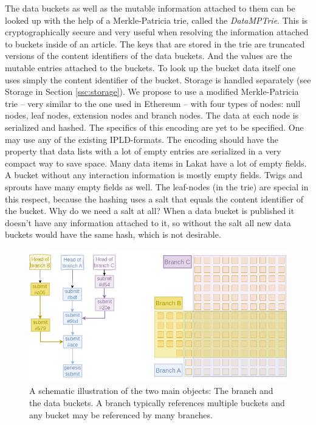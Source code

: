 The data buckets as well as the mutable information attached to them can be looked up with the help of a Merkle-Patricia trie, called the \textit{DataMPTrie}. This is cryptographically secure and very useful when resolving the information attached to buckets inside of an article. The keys that are stored in the trie are truncated versions of the content identifiers of the data buckets. And the values are the mutable entries attached to the buckets. To look up the bucket data itself one uses simply the content identifier of the bucket. Storage is handled separately (see Storage in Section \ref{ssc:storage}).
We propose to use a modified Merkle-Patricia trie -- very similar to the one used in Ethereum -- with four types of nodes: null nodes, leaf nodes, extension nodes and branch nodes.
The data at each node is serialized and hashed. The specifics of this encoding are yet to be specified. One may use any of the existing IPLD-formats. The encoding should have the property that data lists with a lot of empty entries are serialized in a very compact way to save space. Many data items in Lakat have a lot of empty fields. A bucket without any interaction information is mostly empty fields. Twigs and sprouts have many empty fields as well. The leaf-nodes (in the trie) are special in this respect, because the hashing uses a salt that equals the content identifier of the bucket. Why do we need a salt at all? When a data bucket is published it doesn't have any information attached to it, so without the salt all new data buckets would have the same hash, which is not desirable.





\begin{figure}[b!]
  \begin{center}
    \includegraphics[width=1.0\textwidth]{src/img/BranchBucketRelationV2.png}
\end{center}
 \caption{A schematic illustration of the two main objects: The branch and the data buckets. A branch typically references multiple buckets and any bucket may be referenced by many branches.}
 \label{fig:branchbucketrel}
\end{figure}

